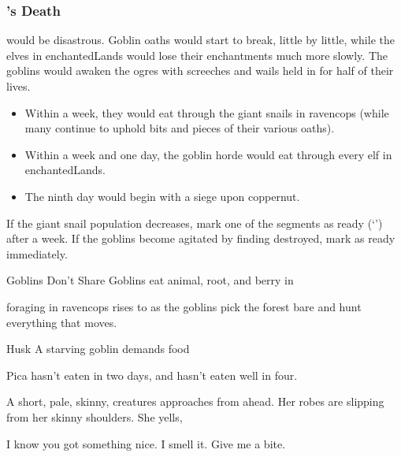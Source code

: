 \begin{multicols}{2}
\label{lastOgreSegment}

\stopcontents[segments]

\subsubsection{'s Death}
would be disastrous.
Goblin oaths would start to break, little by little, while the elves in \gls{enchantedLands} would lose their enchantments much more slowly.
The goblins would awaken the \glspl{ogre} with screeches and wails held in for half of their lives.

\index{\expandafter\Glsfmtname{MindElder}'s Death}

\begin{itemize}
  \item
  Within a week, they would eat through the giant snails in \gls{ravencops} (while many continue to uphold bits and pieces of their various oaths).
  \item
  Within a week and one day, the goblin horde would eat through every elf in \gls{enchantedLands}.
  \item
  The ninth day would begin with a siege upon \gls{coppernut}.
\end{itemize}

\vspace{-3em}
\label{goblinsRise}

\renewcommand\enchantedRations{empty bowl}

If the giant snail population decreases, mark one of the \glspl{segment} as ready (`\sgr') after a week.
If the goblins become agitated by finding  destroyed, mark  as ready immediately.

\setcounter{segNo}{-1}
{Goblins Don't Share}%
{Goblins eat animal, root, and berry in }%

\Gls{foraging} in \gls{ravencops} rises to \tn[16] as the goblins pick the forest bare and hunt everything that moves.

{Husk}%
{A starving goblin demands food}%

Pica hasn't eaten in two days, and hasn't eaten well in four.

\begin{boxtext}
  A short, pale, skinny, creatures approaches from ahead.
  Her robes are slipping from her skinny shoulders.
  She yells,
  \begin{speechtext}
    I know you got something nice.
    I smell it.
    Give me a bite.


\end{speechtext}
\end{boxtext}
\end{multicols}

